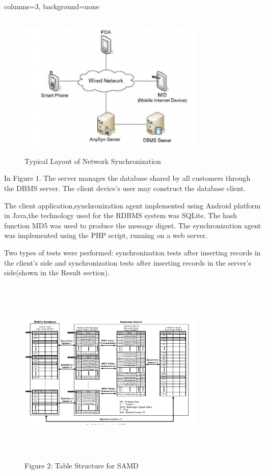 \documentclass[portrait, paperwidth=91cm, paperheight=121cm, fontscale=0.35]{baposter}
\begin{document}
\begin{poster}{columns=3, background=none}
{    \begin{figure}[H] 
    \centering
    \includegraphics[height=7cm, width=9cm]{network.png}
    \caption{Typical Layout of Network Synchronization}\label{network}
    \end{figure}
    
In Figure 1. The server manages the database shared by all customers through the DBMS server. The client device’s user may construct the database client. 
}
{The client application,synchronization agent implemented using Android platform in Java,the technology used for the RDBMS system was SQLite. The hash function MD5 was
used to produce the message digest. The synchronization agent was implemented using the PHP script, running on a web server.

Two types of tests were performed: synchronization tests after inserting records in the client’s side and synchronization tests after inserting records in the server’s side(shown in the Result section).
}

{
    \begin{figure}[H]
    \centering
    \includegraphics[height=9cm, width=9cm]{samd.png}
    \caption{Figure 2: Table Structure for SAMD}\label{samd}
    \end{figure}
    
}
\end{poster}
\end{document}
